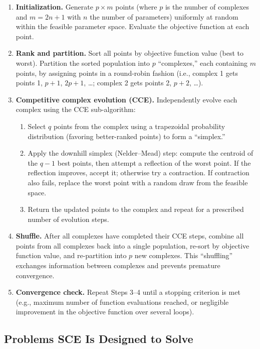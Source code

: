 \documentclass[11pt,letterpaper]{article}
\begin{document}
\begin{enumerate}
    \item \textbf{Initialization.} Generate $p \times m$ points (where $p$ is the number of complexes and $m = 2n+1$ with $n$ the number of parameters) uniformly at random within the feasible parameter space. Evaluate the objective function at each point.

    \item \textbf{Rank and partition.} Sort all points by objective function value (best to worst). Partition the sorted population into $p$ ``complexes,'' each containing $m$ points, by assigning points in a round-robin fashion (i.e., complex 1 gets points 1, $p{+}1$, $2p{+}1$, \ldots; complex 2 gets points 2, $p{+}2$, \ldots).

    \item \textbf{Competitive complex evolution (CCE).} Independently evolve each complex using the CCE sub-algorithm:
    \begin{enumerate}
        \item Select $q$ points from the complex using a trapezoidal probability distribution (favoring better-ranked points) to form a ``simplex.''
        \item Apply the downhill simplex (Nelder--Mead) step: compute the centroid of the $q-1$ best points, then attempt a reflection of the worst point. If the reflection improves, accept it; otherwise try a contraction. If contraction also fails, replace the worst point with a random draw from the feasible space.
        \item Return the updated points to the complex and repeat for a prescribed number of evolution steps.
    \end{enumerate}

    \item \textbf{Shuffle.} After all complexes have completed their CCE steps, combine all points from all complexes back into a single population, re-sort by objective function value, and re-partition into $p$ new complexes. This ``shuffling'' exchanges information between complexes and prevents premature convergence.

    \item \textbf{Convergence check.} Repeat Steps 3--4 until a stopping criterion is met (e.g., maximum number of function evaluations reached, or negligible improvement in the objective function over several loops).
\end{enumerate}

\subsection{Problems SCE Is Designed to Solve}
\end{document}
